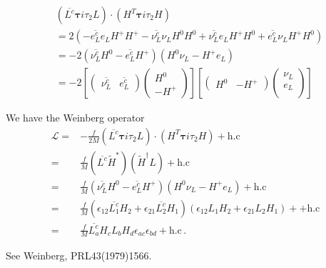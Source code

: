 \begin{align}
\label{eq:details}
&\left(\overline{L^c}\boldsymbol{\tau}i\tau_2L\right)\cdot
  \left( H^T \boldsymbol{\tau} i\tau_2H\right)\nonumber\\
&=2 \left( 
-\overline{e^c_L}e_LH^+H^+-\overline{\nu^c_L}\nu_LH^0H^0
 +\overline{\nu^c_L}e_LH^+H^0
+\overline{e^c_L}\nu_LH^+H^0\right)\nonumber\\
&=-2\left( \overline{\nu^c_L}H^0-\overline{e^c_L}H^+ \right)
\left( H^0\nu_L-H^+e_L \right)\\
&=-2\left[
  \begin{pmatrix}
    \overline{\nu^c_L}& \overline{e^c_L}
  \end{pmatrix}
  \begin{pmatrix}  
    H^0\\
   -H^+    
  \end{pmatrix}
\right]\left[ 
  \begin{pmatrix}
    H^0 & -H^+
  \end{pmatrix}
  \begin{pmatrix}
   \nu_L\\
   e_L\\    
  \end{pmatrix}
 \right]\nonumber
\end{align}


  We have the Weinberg operator
  \begin{align*}
    \mathcal{L}=&  -\frac{f}{2M}\left(\overline{L^c}\boldsymbol{\tau}i\tau_2L\right)\cdot
  \left( H^T \boldsymbol{\tau} i\tau_2H\right)+\text{h.c}\nonumber\\
=&\frac{f}{M}\left( \overline{L^c}\widetilde{H}^{*} \right)
\left( \widetilde{H}^{\dagger}L \right)+\text{h.c}\nonumber\\
=&\frac{f}{M}\left( \overline{\nu^c_L}H^0-\overline{e^c_L}H^+ \right)
\left( H^0\nu_L-H^+e_L \right)+\text{h.c}\nonumber\\
=&\frac{f}{M}\left(\epsilon_{12}\overline{L^c_1}H_2+\epsilon_{21}\overline{L^c_2}H_1  \right)\left( \epsilon_{12}L_1H_2+\epsilon_{21}L_2H_1 \right)++\text{h.c}\nonumber\\
=&\frac{f}{M}\overline{L^c_a}H_cL_bH_d\epsilon_{ac}\epsilon_{bd}+\text{h.c}\,.
\end{align*}

See Weinberg,  PRL43(1979)1566.


